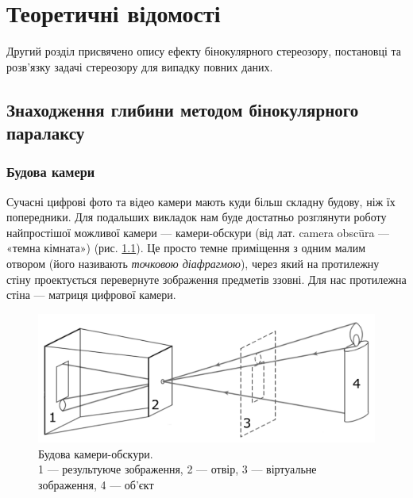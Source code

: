 \chapter{Теоретичні відомості}\label{chapter2}
Другий розділ присвячено опису ефекту бінокулярного стереозору, постановці та розв'язку задачі стереозору для випадку повних даних.

\section{Знаходження глибини методом бінокулярного паралаксу}
\subsection{Будова камери}
Сучасні цифрові фото та відео камери мають куди більш складну будову, ніж їх попередники. Для подальших викладок нам буде достатньо розглянути роботу найпростішої можливої камери --- камери-обскури (від лат. camera obscūra --- «темна кімната») (рис. \ref{1.1.1 - Camera-obscura}). Це просто темне приміщення з одним малим отвором (його називають \textit{точковою діафрагмою}), через який на протилежну стіну проектується перевернуте зображення предметів ззовні. Для нас протилежна стіна --- матриця цифрової камери. 
\begin{figure}[H]
	\centering
	\includegraphics[scale = 0.5]{CO2.pdf}
	\caption{Будова камери-обскури.\\ 1 --- результуюче зображення, 2 --- отвір, 3 --- віртуальне зображення, 4 --- об'єкт}
	\label{1.1.1 - Camera-obscura}
\end{figure}


